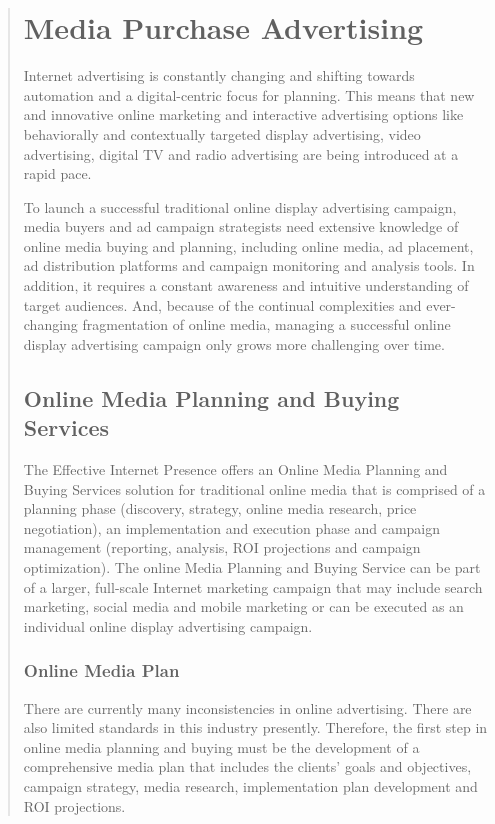 \documentclass[35pt]{report}
\begin{document}
\begin{quote}
		\section{Media Purchase Advertising}

Internet advertising is constantly changing and shifting towards automation and a digital-centric focus for planning. This means that new and innovative online marketing and interactive advertising options like behaviorally and contextually targeted display advertising, video advertising, digital TV and radio advertising are being introduced at a rapid pace.

To launch a successful traditional online display advertising campaign, media buyers and ad campaign strategists need extensive knowledge of online media buying and planning, including online media, ad placement, ad distribution platforms and campaign monitoring and analysis tools. In addition, it requires a constant awareness and intuitive understanding of target audiences. And, because of the continual complexities and ever-changing fragmentation of online media, managing a successful online display advertising campaign only grows more challenging over time.

		\subsection{Online Media Planning and Buying Services}
The Effective Internet Presence offers an Online Media Planning and Buying Services solution for traditional online media that is comprised of a planning phase (discovery, strategy, online media research, price negotiation), an implementation and execution phase and campaign management (reporting, analysis, ROI projections and campaign optimization). The online Media Planning and Buying Service can be part of a larger, full-scale Internet marketing campaign that may include search marketing, social media and mobile marketing or can be executed as an individual online display advertising campaign.

			\subsubsection{Online Media Plan}
There are currently many inconsistencies in online advertising. There are also limited standards in this industry presently. Therefore, the first step in online media planning and buying must be the development of a comprehensive media plan that includes the clients' goals and objectives, campaign strategy, media research, implementation plan development and ROI projections.


\end{quote}
\end{document}
